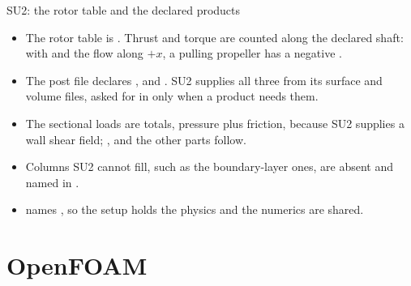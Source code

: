 \begin{frame}[fragile]{SU2: the rotor table and the declared products}
\begin{itemize}\small
  \item The rotor table is . Thrust and
        torque are counted along the declared shaft: with 
        and the flow along $+x$, a pulling propeller has a negative
        .
  \item The post file declares \code{[sections]},  and
        \code{[[probes]]}. SU2 supplies all three from its surface and volume
        files, asked for in  only when a product needs
        them.
  \item The sectional loads are totals, pressure plus friction, because SU2
        supplies a wall shear field; ,  and the
        other parts follow.
  \item Columns SU2 cannot fill, such as the boundary-layer ones, are absent
        and named in .
  \item {} names , so the setup
        holds the physics and the numerics are shared.
\end{itemize}
\end{frame}

\section{OpenFOAM}

